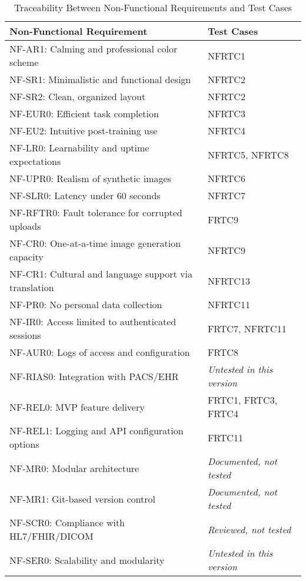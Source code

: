 \documentclass[12pt, titlepage]{article}
\begin{document}
\begin{table}[H]
  \centering
  \caption{Traceability Between Non-Functional Requirements and Test Cases}
  \renewcommand{\arraystretch}{1.3}
  \begin{tabularx}{\textwidth}{|>{\raggedright\arraybackslash}X|>{\raggedright\arraybackslash}m{}|}
    \hline
    \textbf{Non-Functional Requirement} & \textbf{Test Cases} \\
    \hline
    NF-AR1: Calming and professional color scheme & NFRTC1 \\
    \hline
    NF-SR1: Minimalistic and functional design & NFRTC2 \\
    \hline
    NF-SR2: Clean, organized layout & NFRTC2 \\
    \hline
    NF-EUR0: Efficient task completion & NFRTC3 \\
    \hline
    NF-EU2: Intuitive post-training use & NFRTC4 \\
    \hline
    NF-LR0: Learnability and uptime expectations & NFRTC5, NFRTC8 \\
    \hline
    NF-UPR0: Realism of synthetic images & NFRTC6 \\
    \hline
    NF-SLR0: Latency under 60 seconds & NFRTC7 \\
    \hline
    NF-RFTR0: Fault tolerance for corrupted uploads & FRTC9 \\
    \hline
    NF-CR0: One-at-a-time image generation capacity & NFRTC9 \\
    \hline
    NF-CR1: Cultural and language support via translation & NFRTC13 \\
    \hline
    NF-PR0: No personal data collection & NFRTC11 \\
    \hline
    NF-IR0: Access limited to authenticated sessions & FRTC7, NFRTC11 \\
    \hline
    NF-AUR0: Logs of access and configuration & FRTC8 \\
    \hline
    NF-RIAS0: Integration with PACS/EHR & \textit{Untested in this version} \\
    \hline
    NF-REL0: MVP feature delivery & FRTC1, FRTC3, FRTC4 \\
    \hline
    NF-REL1: Logging and API configuration options & FRTC11 \\
    \hline
    NF-MR0: Modular architecture & \textit{Documented, not tested} \\
    \hline
    NF-MR1: Git-based version control & \textit{Documented, not tested} \\
    \hline
    NF-SCR0: Compliance with HL7/FHIR/DICOM & \textit{Reviewed, not tested} \\
    \hline
    NF-SER0: Scalability and modularity & \textit{Untested in this version} \\
    \hline
  \end{tabularx}
\end{table}
\end{document}
